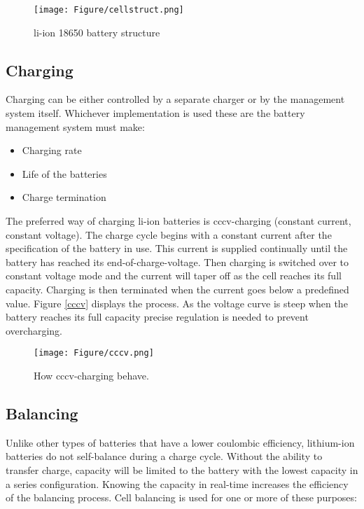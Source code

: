 \begin{figure}[H]
\centering
\texttt{[image: Figure/cellstruct.png]}
\caption{\gls{li-ion} 18650 battery structure}
\label{cellstruct}
\end{figure}

\subsection{Charging}
Charging can be either controlled by a separate charger or by the management system itself. Whichever implementation is used these are the battery management system must make\cite{book111}:

\begin{itemize}
\item Charging rate
\item Life of the batteries
\item Charge termination
\end{itemize}

The preferred way of charging \gls{li-ion} batteries is \gls{cccv}-charging (constant current, constant voltage). The charge cycle begins with a constant current after the specification of the battery in use. This current is supplied continually until the battery has reached its end-of-charge-voltage. Then charging is switched over to constant voltage mode and the current will taper off as the cell reaches its full capacity. Charging is then terminated when the current goes below a predefined value. Figure \autoref{cccv} displays the process. As the voltage curve is steep when the battery reaches its full capacity precise regulation is needed to prevent overcharging\cite{book112}.

\begin{figure}[H]
\centering
\texttt{[image: Figure/cccv.png]}
\caption{How \gls{cccv}-charging behave.}
\label{cccv}
\end{figure}

\subsection{Balancing}
Unlike other types of batteries that have a lower coulombic efficiency, lithium-ion batteries do not self-balance during a charge cycle. Without the ability to transfer charge, capacity will be limited to the battery with the lowest capacity in a series configuration. Knowing the capacity in real-time increases the efficiency of the balancing process.
Cell balancing is used for one or more of these purposes\cite{book183}:

